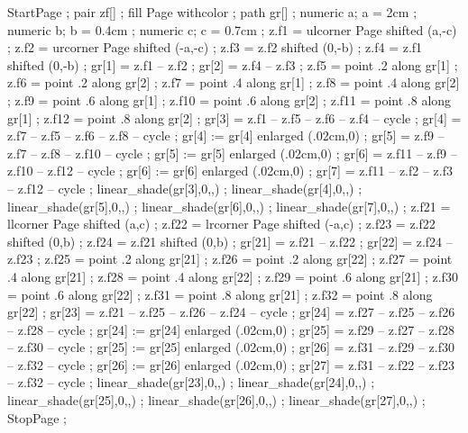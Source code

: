 StartPage ;
pair zf[] ;
fill Page withcolor  ;
path gr[] ;
numeric a; a = 2cm ;
numeric b; b = 0.4cm ;
numeric c; c = 0.7cm ;
z.f1 = ulcorner Page shifted (a,-c) ;
z.f2 = urcorner Page shifted (-a,-c) ;
z.f3 = z.f2 shifted (0,-b) ;
z.f4 = z.f1 shifted (0,-b) ;
gr[1] = z.f1 -- z.f2 ;
gr[2] = z.f4 -- z.f3 ;
z.f5 = point .2 along gr[1] ;
z.f6 = point .2 along gr[2] ;
z.f7 = point .4 along gr[1] ;
z.f8 = point .4 along gr[2] ;
z.f9 = point .6 along gr[1] ;
z.f10 = point .6 along gr[2] ;
z.f11 = point .8 along gr[1] ;
z.f12 = point .8 along gr[2] ;
gr[3] = z.f1 -- z.f5 -- z.f6 -- z.f4 -- cycle ;
gr[4] = z.f7 -- z.f5 -- z.f6 -- z.f8 -- cycle ;
gr[4] := gr[4] enlarged (.02cm,0) ;
gr[5] = z.f9 -- z.f7 -- z.f8 -- z.f10 -- cycle ;
gr[5] := gr[5] enlarged (.02cm,0) ;
gr[6] = z.f11 -- z.f9 -- z.f10 -- z.f12 -- cycle ;
gr[6] := gr[6] enlarged (.02cm,0) ;
gr[7] = z.f11 -- z.f2 -- z.f3 -- z.f12 -- cycle ;
linear_shade(gr[3],0,,) ;
linear_shade(gr[4],0,,) ;
linear_shade(gr[5],0,,) ;
linear_shade(gr[6],0,,) ;
linear_shade(gr[7],0,,) ;
z.f21 = llcorner Page shifted (a,c) ;
z.f22 = lrcorner Page shifted (-a,c) ;
z.f23 = z.f22 shifted (0,b) ;
z.f24 = z.f21 shifted (0,b) ;
gr[21] = z.f21 -- z.f22 ;
gr[22] = z.f24 -- z.f23 ;
z.f25 = point .2 along gr[21] ;
z.f26 = point .2 along gr[22] ;
z.f27 = point .4 along gr[21] ;
z.f28 = point .4 along gr[22] ;
z.f29 = point .6 along gr[21] ;
z.f30 = point .6 along gr[22] ;
z.f31 = point .8 along gr[21] ;
z.f32 = point .8 along gr[22] ;
gr[23] = z.f21 -- z.f25 -- z.f26 -- z.f24 -- cycle ;
gr[24] = z.f27 -- z.f25 -- z.f26 -- z.f28 -- cycle ;
gr[24] := gr[24] enlarged (.02cm,0) ;
gr[25] = z.f29 -- z.f27 -- z.f28 -- z.f30 -- cycle ;
gr[25] := gr[25] enlarged (.02cm,0) ;
gr[26] = z.f31 -- z.f29 -- z.f30 -- z.f32 -- cycle ;
gr[26] := gr[26] enlarged (.02cm,0) ;
gr[27] = z.f31 -- z.f22 -- z.f23 -- z.f32 -- cycle ;
linear_shade(gr[23],0,,) ;
linear_shade(gr[24],0,,) ;
linear_shade(gr[25],0,,) ;
linear_shade(gr[26],0,,) ;
linear_shade(gr[27],0,,) ;
StopPage ;
\stopuniqueMPgraphic


